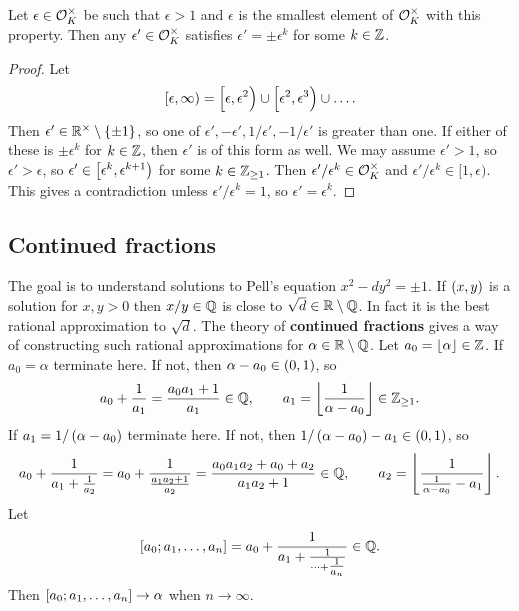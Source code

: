 \begin{lemma}
Let $ \epsilon \in \mathcal{O}_K^\times $ be such that $ \epsilon > 1 $ and $ \epsilon $ is the smallest element of $ \mathcal{O}_K^\times $ with this property. Then any $ \epsilon' \in \mathcal{O}_K^\times $ satisfies $ \epsilon' = \pm\epsilon^k $ for some $ k \in \mathbb{Z} $.
\end{lemma}

\begin{proof}
Let
$$ \intco{\epsilon, \infty} = \intco{\epsilon, \epsilon^2} \cup \intco{\epsilon^2, \epsilon^3} \cup \dots. $$
Then $ \epsilon' \in \RR^\times \setminus \cbr{\pm 1} $, so one of $ \epsilon', -\epsilon', 1 / \epsilon', -1 / \epsilon' $ is greater than one. If either of these is $ \pm\epsilon^k $ for $ k \in \mathbb{Z} $, then $ \epsilon' $ is of this form as well. We may assume $ \epsilon' > 1 $, so $ \epsilon' > \epsilon $, so $ \epsilon' \in \intco{\epsilon^k, \epsilon^{k + 1}} $ for some $ k \in \mathbb{Z}_{\ge 1} $. Then $ \epsilon' / \epsilon^k \in \mathcal{O}_K^\times $ and $ \epsilon' / \epsilon^k \in [1, \epsilon) $. This gives a contradiction unless $ \epsilon' / \epsilon^k = 1 $, so $ \epsilon' = \epsilon^k $.
\end{proof}

\subsection{Continued fractions}

The goal is to understand solutions to Pell's equation $ x^2 - dy^2 = \pm 1 $. If $ \br{x, y} $ is a solution for $ x, y > 0 $ then $ x / y \in \mathbb{Q} $ is close to $ \sqrt{d} \in \mathbb{R} \setminus \mathbb{Q} $. In fact it is the best rational approximation to $ \sqrt{d} $. The theory of \textbf{continued fractions} gives a way of constructing such rational approximations for $ \alpha \in \mathbb{R} \setminus \mathbb{Q} $. Let $ a_0 = \left\lfloor \alpha \right\rfloor \in \mathbb{Z} $. If $ a_0 = \alpha $ terminate here. If not, then $ \alpha - a_0 \in \br{0, 1} $, so
$$ a_0 + \dfrac{1}{a_1} = \dfrac{a_0a_1 + 1}{a_1} \in \mathbb{Q}, \qquad a_1 = \left\lfloor \dfrac{1}{\alpha - a_0} \right\rfloor \in \mathbb{Z}_{\ge 1}. $$
If $ a_1 = 1 / \br{\alpha - a_0} $ terminate here. If not, then $ 1 / \br{\alpha - a_0} - a_1 \in \br{0, 1} $, so
$$ a_0 + \dfrac{1}{a_1 + \tfrac{1}{a_2}} = a_0 + \dfrac{1}{\tfrac{a_1a_2 + 1}{a_2}} = \dfrac{a_0a_1a_2 + a_0 + a_2}{a_1a_2 + 1} \in \mathbb{Q}, \qquad a_2 = \left\lfloor \dfrac{1}{\tfrac{1}{\alpha - a_0} - a_1} \right\rfloor. $$
Let
$$ \sbr{a_0; a_1, \dots, a_n} = a_0 + \dfrac{1}{a_1 + \tfrac{1}{\dots + \tfrac{1}{a_n}}} \in \QQ. $$
Then $ \sbr{a_0; a_1, \dots, a_n} \to \alpha $ when $ n \to \infty $.

